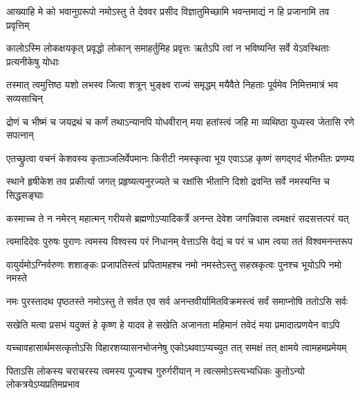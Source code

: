 \fourlineindentedshloka
{आख्याहि मे को भवानुग्ररूपो}
{नमोऽस्तु ते देववर प्रसीद}
{विज्ञातुमिच्छामि भवन्तमाद्यं}
{न हि प्रजानामि तव प्रवृत्तिम्}%

{}
\fourlineindentedshloka
{कालोऽस्मि लोकक्षयकृत् प्रवृद्धो}
{लोकान् समाहर्तुमिह प्रवृत्तः}
{ऋतेऽपि त्वां न भविष्यन्ति सर्वे}
{येऽवस्थिताः प्रत्यनीकेषु योधाः}%

\fourlineindentedshloka
{तस्मात् त्वमुत्तिष्ठ यशो लभस्व}
{जित्वा शत्रून् भुङ्क्ष्व राज्यं समृद्धम्}
{मयैवैते निहताः पूर्वमेव}
{निमित्तमात्रं भव सव्यसाचिन्}%

\fourlineindentedshloka
{द्रोणं च भीष्मं च जयद्रथं च}
{कर्णं तथाऽन्यानपि योधवीरान्}
{मया हतांस्त्वं जहि मा व्यथिष्ठा}
{युध्यस्व जेतासि रणे सपत्नान्}%

\fourlineindentedshloka
{एतच्छ्रुत्वा वचनं केशवस्य}
{कृताञ्जलिर्वेपमानः किरीटी}
{नमस्कृत्वा भूय एवाऽऽह कृष्णं}
{सगद्गदं भीतभीतः प्रणम्य}%

{}
\fourlineindentedshloka
{स्थाने हृषीकेश तव प्रकीर्त्या}
{जगत् प्रहृष्यत्यनुरज्यते च}
{रक्षांसि भीतानि दिशो द्रवन्ति}
{सर्वे नमस्यन्ति च सिद्धसङ्घाः}%

\fourlineindentedshloka
{कस्माच्च ते न नमेरन् महात्मन्}
{गरीयसे ब्रह्मणोऽप्यादिकर्त्रे}
{अनन्त देवेश जगन्निवास}
{त्वमक्षरं सदसत्तत्परं यत्}%

\fourlineindentedshloka
{त्वमादिदेवः पुरुषः पुराणः}
{त्वमस्य विश्वस्य परं निधानम्}
{वेत्ताऽसि वेद्यं च परं च धाम}
{त्वया ततं विश्वमनन्तरूप}%

\fourlineindentedshloka
{वायुर्यमोऽग्निर्वरुणः शशाङ्कः}
{प्रजापतिस्त्वं प्रपितामहश्च}
{नमो नमस्तेऽस्तु सहस्रकृत्वः}
{पुनश्च भूयोऽपि नमो नमस्ते}%

\fourlineindentedshloka
{नमः पुरस्तादथ पृष्ठतस्ते}
{नमोऽस्तु ते सर्वत एव सर्व}
{अनन्तवीर्यामितविक्रमस्त्वं}
{सर्वं समाप्नोषि ततोऽसि सर्वः}%

\fourlineindentedshloka
{सखेति मत्वा प्रसभं यदुक्तं}
{हे कृष्ण हे यादव हे सखेति}
{अजानता महिमानं तवेदं}
{मया प्रमादात्प्रणयेन वाऽपि}%

\fourlineindentedshloka
{यच्चावहासार्थमसत्कृतोऽसि}
{विहारशय्यासनभोजनेषु}
{एकोऽथवाऽप्यच्युत तत् समक्षं}
{तत् क्षामये त्वामहमप्रमेयम्}%

\fourlineindentedshloka
{पिताऽसि लोकस्य चराचरस्य}
{त्वमस्य पूज्यश्च गुरुर्गरीयान्}
{न त्वत्समोऽस्त्यभ्यधिकः कुतोऽन्यो}
{लोकत्रयेऽप्यप्रतिमप्रभाव}%

